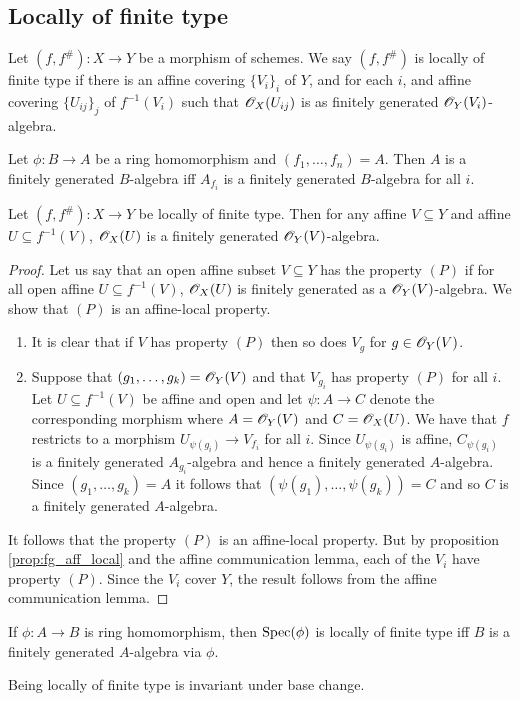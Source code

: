 \documentclass{memoir}
\begin{document}
\subsection{Locally of finite type}
\begin{definition}
    Let $(f,f^\#):X\to Y$ be a morphism of schemes.
    We say $(f,f^\#)$ is locally of finite type if there is an affine covering $\{V_i\}_i$ of $Y$, and for each $i$, and affine covering $\{U_{ij}\}_j$ of $f^{-1}(V_i)$ such that $\mathscr{O}_X(U_{ij})$ is as finitely generated $\mathscr{O}_Y(V_i)$-algebra.
\end{definition}
\begin{proposition}
    \label{prop:fg_aff_local}
    Let $\phi:B\to A$ be a ring homomorphism and $(f_1,\dots,f_n) = A$.
    Then $A$ is a finitely generated $B$-algebra iff $A_{f_i}$ is a finitely generated $B$-algebra for all $i$.
\end{proposition}
\begin{thm}
    Let $(f,f^\#):X\to Y$ be locally of finite type.
    Then for any affine $V\subseteq Y$ and affine $U\subseteq f^{-1}(V)$, $\mathscr{O}_X(U)$ is a finitely generated $\mathscr{O}_Y(V)$-algebra.
\end{thm}
\begin{proof}
    Let us say that an open affine subset $V\subseteq Y$ has the property $(P)$ if for all open affine $U\subseteq f^{-1}(V)$, $\mathscr{O}_X(U)$ is finitely generated as a $\mathscr{O}_Y(V)$-algebra.
    We show that $(P)$ is an affine-local property.
    \begin{enumerate}
        \item It is clear that if $V$ has property $(P)$ then so does $V_g$ for $g\in \mathscr{O}_Y(V)$.
        \item Suppose that $(g_1,\dots,g_k) = \mathscr{O}_Y(V)$ and that $V_{g_i}$ has property $(P)$ for all $i$.
    Let $U\subseteq f^{-1}(V)$ be affine and open and let $\psi:A\to C$ denote the corresponding morphism where $A = \mathscr{O}_Y(V)$ and $C = \mathscr{O}_X(U)$.
    We have that $f$ restricts to a morphism $U_{\psi(g_i)}\to V_{f_i}$ for all $i$.
    Since $U_{\psi(g_i)}$ is affine, $C_{\psi(g_i)}$ is a finitely generated $A_{g_i}$-algebra and hence a finitely generated $A$-algebra.
    Since $(g_1,\dots,g_k) = A$ it follows that $(\psi(g_1),\dots,\psi(g_k)) = C$ and so $C$ is a finitely generated $A$-algebra.
    \end{enumerate}
    It follows that the property $(P)$ is an affine-local property.
    But by proposition \ref{prop:fg_aff_local} and the affine communication lemma, each of the $V_i$ have property $(P)$.
    Since the $V_i$ cover $Y$, the result follows from the affine communication lemma.
\end{proof}
\begin{remark}
    If $\phi:A\to B$ is ring homomorphism, then $\operatorname{Spec}(\phi)$ is locally of finite type iff $B$ is a finitely generated $A$-algebra via $\phi$.
\end{remark}
\begin{proposition}
    Being locally of finite type is invariant under base change.
\end{proposition}
\end{document}
